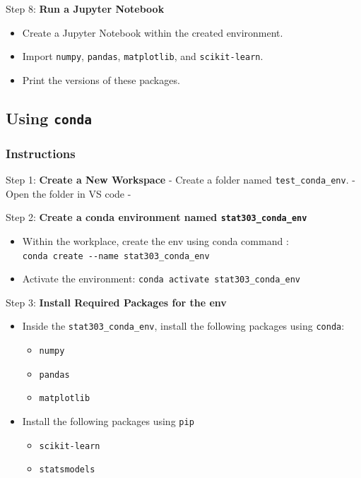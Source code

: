 \documentclass[
  letterpaper,
  DIV=11,
  numbers=noendperiod]{scrreprt}
\providecommand{\tightlist}{%
  \setlength{\itemsep}{0pt}\setlength{\parskip}{0pt}}\usepackage{longtable,booktabs,array}
\begin{document}
Step 8: \textbf{Run a Jupyter Notebook}

\begin{itemize}
\tightlist
\item
  Create a Jupyter Notebook within the created environment.
\item
  Import \texttt{numpy}, \texttt{pandas}, \texttt{matplotlib}, and
  \texttt{scikit-learn}.
\item
  Print the versions of these packages.
\end{itemize}

\hypertarget{using-conda}{%
\subsection{\texorpdfstring{Using
\texttt{conda}}{Using conda}}\label{using-conda}}

\hypertarget{instructions-1}{%
\subsubsection{Instructions}\label{instructions-1}}

Step 1: \textbf{Create a New Workspace} - Create a folder named
\texttt{test\_conda\_env}. - Open the folder in VS code -

Step 2: \textbf{Create a conda environment named
\texttt{stat303\_conda\_env}}

\begin{itemize}
\tightlist
\item
  Within the workplace, create the env using conda command :
  \texttt{conda\ create\ -\/-name\ stat303\_conda\_env}
\item
  Activate the environment:
  \texttt{conda\ activate\ stat303\_conda\_env}
\end{itemize}

Step 3: \textbf{Install Required Packages for the env}

\begin{itemize}
\tightlist
\item
  Inside the \texttt{stat303\_conda\_env}, install the following
  packages using \texttt{conda}:

  \begin{itemize}
  \tightlist
  \item
    \texttt{numpy}
  \item
    \texttt{pandas}
  \item
    \texttt{matplotlib}
  \end{itemize}
\item
  Install the following packages using \texttt{pip}

  \begin{itemize}
  \tightlist
  \item
    \texttt{scikit-learn}
  \item
    \texttt{statsmodels}
  \end{itemize}
\end{itemize}
\end{document}
